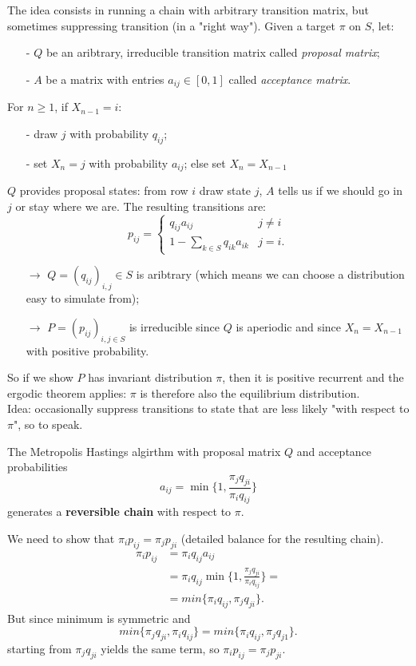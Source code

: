 \documentclass{article}
\begin{document}
	The idea consists in running a chain with arbitrary transition matrix, but sometimes suppressing transition (in a "right way"). Given a target $\pi$ on $S$, let:
	\begin{itemize}
		\item [-]$Q$ be an aribtrary, irreducible transition matrix called \textit{proposal matrix};
		\item [-]$A$ be a matrix with entries $a_{ij}\in[0,1]$ called \textit{acceptance matrix}.
	\end{itemize}
	\begin{algorithm}
		For $n\geqslant 1$, if $X_{n-1}=i$:
		\begin{itemize}
			\item [-] draw $j$ with probability $q_{ij}$;
			\item [-] set $X_n=j$ with probability $a_{ij}$; else set $X_n=X_{n-1}$
		\end{itemize}
	\end{algorithm}
	$Q$ provides proposal states: from row $i$ draw state $j$, $A$ tells us if we should go in $j$ or stay where we are. The resulting transitions are:
	\[
	p_{ij}=\begin{cases}
		q_{ij}a_{ij} &j\neq i\\
		1-\sum_{k\in S}  q_{ik}a_{ik} &j=i.
	\end{cases}
	\]
	\begin{itemize}
		\item[$\rightarrow$]$Q=(q_{ij})_{i,j}\in S$ is aribtrary (which means we can choose a distribution easy to simulate from);
		\item[$\rightarrow$]$P=(p_{ij})_{i,j\in S}$ is irreducible since $Q$ is aperiodic and since $X_n=X_{n-1}$ with positive probability.
	\end{itemize}
	So if we show $P$ has invariant distribution $\pi$, then it is positive recurrent and the ergodic theorem applies: $\pi$ is therefore also the equilibrium distribution. \\
	Idea: occasionally suppress transitions to state that are less likely "with respect to $\pi$", so to speak.
	\begin{proposition}
		The Metropolis Hastings algirthm with proposal matrix $Q$ and acceptance probabilities
		\[
		a_{ij}=\min\bigg\{1,\frac{\pi_jq_{ji}}{\pi_iq_{ij}}\bigg\}
		\]
		generates a \textbf{reversible chain} with respect to $\pi$.
	\end{proposition}
	\begin{proof2}
		We need to show that $\pi_ip_{ij}=\pi_jp_{ji}$ (detailed balance for the resulting chain).
		\begin{align*}
			\pi_ip_{ij}&=\pi_iq_{ij}a_{ij}\\
			&=\pi_iq_{ij}\min\bigg\{1,\frac{\pi_jq_{ji}}{\pi_iq_{ij}}\bigg\}=\\
			&=min\bigg\{\pi_iq_{ij},\pi_jq_{ji}\bigg\}.
		\end{align*}
		But since minimum is symmetric and \[
		min\big\{\pi_jq_{ji},\pi_iq_{ij}\big\}=min\big\{\pi_iq_{ij},\pi_jq_{j1}\big\}.
		\]
		starting from $\pi_jq_{ji}$ yields the same term, so $\pi_i p_{ij}=\pi_jp_{ji}$.
	\end{proof2}
\end{document}
